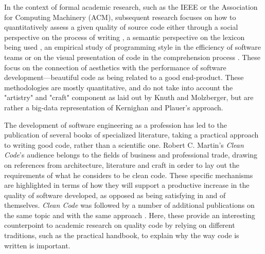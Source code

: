 In the context of formal academic research, such as the IEEE or the Association for Computing Machinery (ACM), subsequent research focuses on how to quantitatively assess a given quality of source code either through a social perspective on the process of writing \citep{norick_effects_2010}, a semantic perspective on the lexicon being used \citep{fakhoury_improving_2019,guerrouj_normalizing_2013}, an empirical study of programming style in the efficiency of software teams \citep{reed_sometimes_2010,coleman_aesthetics_2018} or on the visual presentation of code in the comprehension process \citep{marcus_graphic_1982}. These focus on the connection of aesthetics with the performance of software development—beautiful code as being related to a good end-product. These methodologies are mostly quantitative, and do not take into account the "artistry" and "craft" component as laid out by Knuth and Molzberger, but are rather a big-data representation of Kernighan and Plauer's approach.

The development of software engineering as a profession has led to the publication of several books of specialized literature, taking a practical approach to writing good code, rather than a scientific one. Robert C. Martin's \emph{Clean Code}'s audience belongs to the fields of business and professional trade, drawing on references from architecture, literature and craft in order to lay out the requirements of what he considers to be clean code. These specific mechanisms are highlighted in terms of how they will support a productive increase in the quality of software developed, as opposed as being satisfying in and of themselves. \emph{Clean Code} was followed by a number of additional publications on the same topic and with the same approach \citep{fowler_refactoring_1999,arns_code_2005,hunt_pragmatic_1999}. Here, these provide an interesting counterpoint to academic research on quality code by relying on different traditions, such as the practical handbook, to explain why the way code is written is important.

